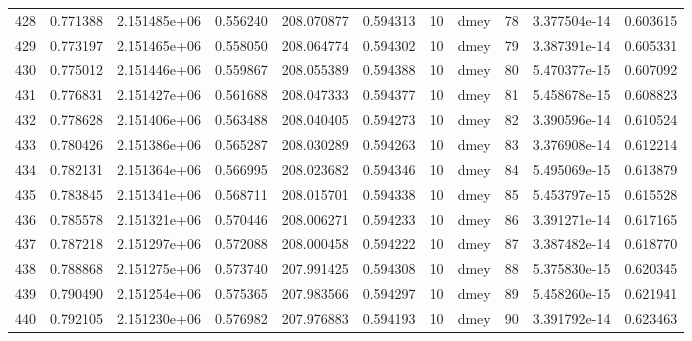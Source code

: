 \begin{tabular}{lrrrrrrlrrr}
428  &    0.771388 &        2.151485e+06 &  0.556240 &              208.070877 &    0.594313 &      10 &         dmey &     78 &   3.377504e-14 &      0.603615 \\
429  &    0.773197 &        2.151465e+06 &  0.558050 &              208.064774 &    0.594302 &      10 &         dmey &     79 &   3.387391e-14 &      0.605331 \\
430  &    0.775012 &        2.151446e+06 &  0.559867 &              208.055389 &    0.594388 &      10 &         dmey &     80 &   5.470377e-15 &      0.607092 \\
431  &    0.776831 &        2.151427e+06 &  0.561688 &              208.047333 &    0.594377 &      10 &         dmey &     81 &   5.458678e-15 &      0.608823 \\
432  &    0.778628 &        2.151406e+06 &  0.563488 &              208.040405 &    0.594273 &      10 &         dmey &     82 &   3.390596e-14 &      0.610524 \\
433  &    0.780426 &        2.151386e+06 &  0.565287 &              208.030289 &    0.594263 &      10 &         dmey &     83 &   3.376908e-14 &      0.612214 \\
434  &    0.782131 &        2.151364e+06 &  0.566995 &              208.023682 &    0.594346 &      10 &         dmey &     84 &   5.495069e-15 &      0.613879 \\
435  &    0.783845 &        2.151341e+06 &  0.568711 &              208.015701 &    0.594338 &      10 &         dmey &     85 &   5.453797e-15 &      0.615528 \\
436  &    0.785578 &        2.151321e+06 &  0.570446 &              208.006271 &    0.594233 &      10 &         dmey &     86 &   3.391271e-14 &      0.617165 \\
437  &    0.787218 &        2.151297e+06 &  0.572088 &              208.000458 &    0.594222 &      10 &         dmey &     87 &   3.387482e-14 &      0.618770 \\
438  &    0.788868 &        2.151275e+06 &  0.573740 &              207.991425 &    0.594308 &      10 &         dmey &     88 &   5.375830e-15 &      0.620345 \\
439  &    0.790490 &        2.151254e+06 &  0.575365 &              207.983566 &    0.594297 &      10 &         dmey &     89 &   5.458260e-15 &      0.621941 \\
440  &    0.792105 &        2.151230e+06 &  0.576982 &              207.976883 &    0.594193 &      10 &         dmey &     90 &   3.391792e-14 &      0.623463 \\

\end{tabular}
